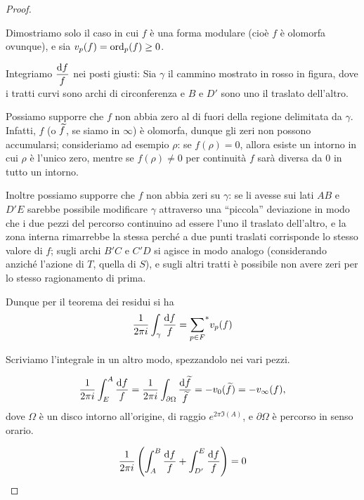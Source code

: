 \begin{proof}
	\begin{figure}
		
	\end{figure}
	Dimostriamo solo il caso in cui $f$ è una forma modulare (cioè $f$ è olomorfa ovunque), e sia $v_p(f)=\text{ord}_p(f)\geq0$.

	Integriamo $\displaystyle \frac{\text{d} f}{f}$ nei posti giusti: Sia $\gamma$ il cammino mostrato in rosso in figura, dove i tratti curvi sono archi di circonferenza e $B$ e $D'$ sono uno il traslato dell'altro.

	Possiamo supporre che $f$ non abbia zero al di fuori della regione delimitata da $\gamma$.
	Infatti, $f$ (o $\widetilde{f}$, se siamo in $\infty$) è olomorfa, dunque gli zeri non possono accumularsi; consideriamo ad esempio $\rho$: se $f(\rho)=0$, allora esiste un intorno in cui $\rho$ è l'unico zero, mentre se $f(\rho)\neq0$ per continuità $f$ sarà diversa da $0$ in tutto un intorno.

	Inoltre possiamo supporre che $f$ non abbia zeri su $\gamma$: se li avesse sui lati $AB$ e $D'E$ sarebbe possibile modificare $\gamma$ attraverso una ``piccola'' deviazione in modo che i due pezzi del percorso continuino ad essere l'uno il traslato dell'altro, e la zona interna rimarrebbe la stessa perché a due punti traslati corrisponde lo stesso valore di $f$; sugli archi $B'C$ e $C'D$ si agisce in modo analogo (considerando anziché l'azione di $T$, quella di $S$), e sugli altri tratti è possibile non avere zeri per lo stesso ragionamento di prima.

	Dunque per il teorema dei residui si ha
	\begin{equation*}
		\frac{1}{2\pi i} \int_{\gamma} \frac{\text{d} f}{f}={\sum_{p\in F}}^{*}v_p(f)
	\end{equation*}

	Scriviamo l'integrale in un altro modo, spezzandolo nei vari pezzi.

	\begin{equation*}
		\frac{1}{2\pi i}\int_E^A\frac{\text{d} f}{f}=\frac{1}{2\pi i}\int_{\partial\Omega}\frac{\text{d} \widetilde{f}}{\widetilde{f}}=-v_0(\widetilde{f})=-v_\infty(f),
	\end{equation*}
	dove $\Omega$ è un disco intorno all'origine, di raggio $e^{2\pi \Im(A)}$, e $\partial\Omega$ è percorso in senso orario.

	\begin{equation*}
		\frac{1}{2\pi i}\left( \int_A^B\frac{\text{d} f}{f} + \int_{D'}^E\frac{\text{d} f}{f} \right) =0
	\end{equation*}


\end{proof}

